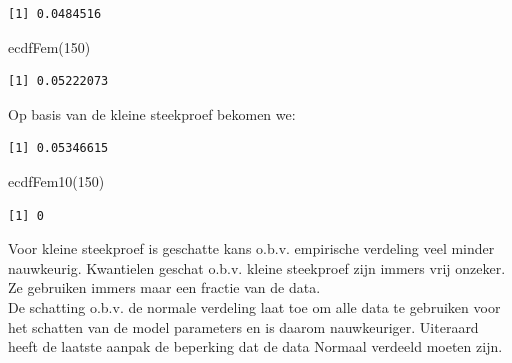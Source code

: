 \documentclass[
  dutch,
  letterpaper,
  12pt]{book}
\newenvironment{Shaded}{\begin{snugshade}}{\end{snugshade}}
\newcommand{\DecValTok}[1]{\textcolor[rgb]{0.68,0.00,0.00}{#1}}
\newcommand{\FunctionTok}[1]{\textcolor[rgb]{0.28,0.35,0.67}{#1}}
\newcommand{\NormalTok}[1]{\textcolor[rgb]{0.00,0.23,0.31}{#1}}
\newcommand{\SpecialCharTok}[1]{\textcolor[rgb]{0.37,0.37,0.37}{#1}}
\theoremstyle{definition}
\theoremstyle{definition}
\theoremstyle{definition}
\theoremstyle{remark}
\begin{document}
\begin{Shaded}
\end{Shaded}

\begin{verbatim}
[1] 0.0484516
\end{verbatim}

\begin{Shaded}
\begin{Highlighting}[]
\FunctionTok{ecdfFem}\NormalTok{(}\DecValTok{150}\NormalTok{)}
\end{Highlighting}
\end{Shaded}

\begin{verbatim}
[1] 0.05222073
\end{verbatim}

Op basis van de kleine steekproef bekomen we:

\begin{Shaded}
\end{Shaded}

\begin{verbatim}
[1] 0.05346615
\end{verbatim}

\begin{Shaded}
\begin{Highlighting}[]
\FunctionTok{ecdfFem10}\NormalTok{(}\DecValTok{150}\NormalTok{)}
\end{Highlighting}
\end{Shaded}

\begin{verbatim}
[1] 0
\end{verbatim}

Voor kleine steekproef is geschatte kans o.b.v. empirische verdeling
veel minder nauwkeurig. Kwantielen geschat o.b.v. kleine steekproef zijn
immers vrij onzeker. Ze gebruiken immers maar een fractie van de data.\\
De schatting o.b.v. de normale verdeling laat toe om alle data te
gebruiken voor het schatten van de model parameters en is daarom
nauwkeuriger. Uiteraard heeft de laatste aanpak de beperking dat de data
Normaal verdeeld moeten zijn.
\end{document}
